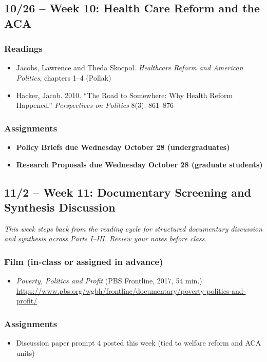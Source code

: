 \documentclass[12pt]{article}
\begin{document}
\subsection*{10/26 -- Week 10: Health Care Reform and the ACA}
    \subsubsection*{Readings}
        \begin{itemize}
            \item Jacobs, Lawrence and Theda Skocpol. \emph{Healthcare Reform and American Politics}, chapters 1--4 (Pollak)
            \item Hacker, Jacob. 2010. ``The Road to Somewhere: Why Health Reform Happened.'' \emph{Perspectives on Politics} 8(3): 861--876
        \end{itemize}
    \subsubsection*{Assignments}
        \begin{itemize}
            \item \textbf{Policy Briefs due Wednesday October 28 (undergraduates)}
            \item \textbf{Research Proposals due Wednesday October 28 (graduate students)}
        \end{itemize}

\subsection*{11/2 -- Week 11: Documentary Screening and Synthesis Discussion}
\emph{This week steps back from the reading cycle for structured documentary discussion and synthesis across Parts I--III. Review your notes before class.}
    \subsubsection*{Film (in-class or assigned in advance)}
        \begin{itemize}
            \item \emph{Poverty, Politics and Profit} (PBS Frontline, 2017, 54 min.) \\
            \url{https://www.pbs.org/wgbh/frontline/documentary/poverty-politics-and-profit/}
        \end{itemize}
    \subsubsection*{Assignments}
        \begin{itemize}
            \item Discussion paper prompt 4 posted this week (tied to welfare reform and ACA units)
        \end{itemize}
\end{document}
